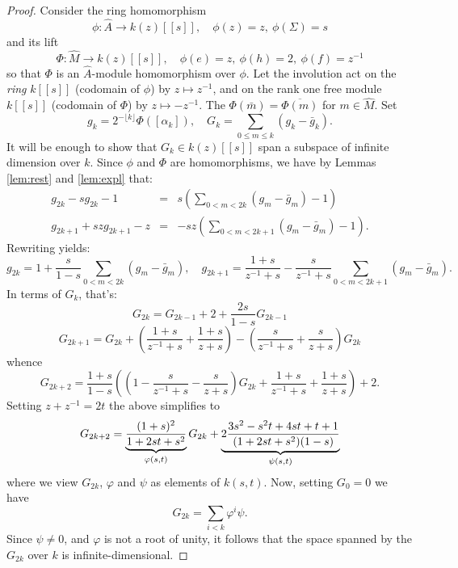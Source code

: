 \documentclass{article}
\def\fS{\mathfrak{S}}
\theoremstyle{definition}
\begin{document}
\begin{proof}
%
Consider the ring homomorphism
$$
\phi : \widehat A \rightarrow k(z)[[s]],\quad \phi(z)=z,\ \phi(\Sigma)=s 
$$
and its lift 
$$
\Phi : \widehat M \rightarrow k(z)[[s]],\quad \phi(e)=z,\ \phi(h)=2,\ \phi(f)=z^{-1}
$$
so that $\Phi$ is an $\widehat A$-module homomorphism over $\phi$.
Let the involution act on the \emph{ring} $k[[s]]$ (codomain of $\phi$)
by $z \mapsto z^{-1}$,
and on the  rank one free module $k[[s]]$ (codomain of $\Phi$)
by $z \mapsto -z^{-1}$.
The $\Phi(\bar m)=\overline{\Phi(m)}$ for $m \in \widehat M$.
Set
$$ g_k = 2^{-\lfloor k\rfloor} \Phi([\alpha_k]),\quad
G_k = \sum_{0\le m \le k} (g_k-\bar g_k). $$
It will be enough to show that $G_k \in k(z)[[s]]$ span a subspace of infinite dimension
over $k$. Since $\phi$ and $\Phi$ are homomorphisms, we have 
by Lemmas \ref{lem:rest} and \ref{lem:expl} that:
$$\begin{aligned}
        g_{2k} - sg_{2k} - 1 &=& s \left( \sum_{0<m<2k} (g_m-\bar g_m) - 1 \right)\\
        g_{2k+1} + szg_{2k+1} - z &=& -sz \left( \sum_{0<m<2k+1} (g_m-\bar g_m) - 1 \right).
\end{aligned}$$
Rewriting yields:
$$
g_{2k} = 1 + \frac{s}{1-s} \sum_{0<m<2k} (g_m-\bar g_m),\quad
g_{2k+1} = \frac{1+s}{z^{-1}+s}-\frac{s}{z^{-1}+s} \sum_{0<m<2k+1} (g_m-\bar g_m).
$$
In terms of $G_k$, that's:
$$
G_{2k} = G_{2k-1} + 2 + \frac{2s}{1-s}G_{2k-1}
$$
$$
G_{2k+1} = G_{2k} + \left(\frac{1+s}{z^{-1}+s} + \frac{1+s}{z+s}\right) - \left(\frac{s}{z^{-1}+s} + \frac{s}{z+s}\right)G_{2k} 
$$
whence
$$
G_{2k+2} = \frac{1+s}{1-s}  \left(\left(1-\frac{s}{z^{-1}+s} - \frac{s}{z+s} \right) G_{2k} + \frac{1+s}{z^{-1}+s}
+ \frac{1+s}{z+s}\right) + 2.
$$
Setting $z+z^{-1}=2t$ the above simplifies to
$$
G_{2k+2}= \underbrace{\frac{(1+s)^2}{1+2st+s^2}}_{\varphi(s,t)} G_{2k} + \underbrace{2 \frac{
3s^2 - s^2t + 4st + t + 1
}{(1+2st+s^2)(1-s)}}_{\psi(s,t)}
$$
where we view $G_{2k}$, $\varphi$ and $\psi$ as 
elements of $k(s,t)$.
Now, setting $G_0=0$
we have
$$G_{2k} =\sum_{i<k} \varphi^i \psi.$$
Since $\psi\neq0$, and $\varphi$ is not a root of unity,
it follows that the space spanned by the $G_{2k}$ over $k$
is infinite-dimensional.
\end{proof}
\end{document}
